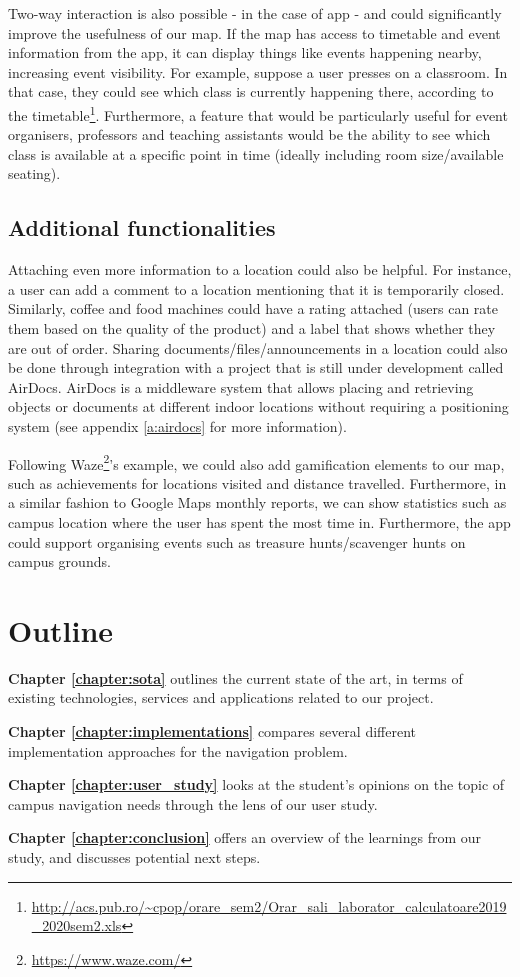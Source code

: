         Two-way interaction is also possible - in the case of \gls{app} - and could significantly improve the usefulness of our map. If the map has access to timetable and event information from the app, it can display things like events happening nearby, increasing event visibility. For example, suppose a user presses on a classroom. In that case, they could see which class is currently happening there, according to the timetable\footnote{\url{http://acs.pub.ro/~cpop/orare_sem2/Orar_sali_laborator_calculatoare2019_2020sem2.xls}}. Furthermore, a feature that would be particularly useful for event organisers, professors and teaching assistants would be the ability to see which class is available at a specific point in time (ideally including room size/available seating).
        
    \subsection{Additional functionalities} \label{1:functionalities_additional}
    
        Attaching even more information to a location could also be helpful. For instance, a user can add a comment to a location mentioning that it is temporarily closed. Similarly, coffee and food machines could have a rating attached (users can rate them based on the quality of the product) and a label that shows whether they are out of order. Sharing documents/files/announcements in a location could also be done through integration with a project that is still under development called AirDocs. AirDocs is a middleware system that allows placing and retrieving objects or documents at different indoor locations without requiring a positioning system (see appendix \ref{a:airdocs} for more information).
        
        Following Waze\footnote{\url{https://www.waze.com/}}'s example, we could also add gamification elements to our map, such as achievements for locations visited and distance travelled. Furthermore, in a similar fashion to Google Maps monthly reports, we can show statistics such as campus location where the user has spent the most time in. Furthermore, the app could support organising events such as treasure hunts/scavenger hunts on campus grounds.

\section{Outline} \label{1:outline}
    \textbf{Chapter \ref{chapter:sota}} outlines the current state of the art, in terms of existing technologies, services and applications related to our project.
    
    \textbf{Chapter \ref{chapter:implementations}} compares several different implementation approaches for the navigation problem.
    
    \textbf{Chapter \ref{chapter:user_study}} looks at the student's opinions on the topic of campus navigation needs through the lens of our user study.
    
    \textbf{Chapter \ref{chapter:conclusion}} offers an overview of the learnings from our study, and discusses potential next steps.